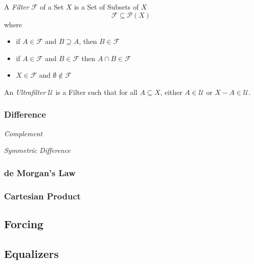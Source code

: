 \documentclass{article}
\begin{document}
A \emph{Filter} $\mathcal{F}$ of a Set $X$ is a Set of Subsets of $X$
\[
    \mathcal{F} \subseteq \mathcal{P}(X)
\]
where
\begin{itemize}
\item if $A \in \mathcal{F}$ and $B \supseteq A$, then $B \in
  \mathcal{F}$
\item if $A \in \mathcal{F}$ and $B \in \mathcal{F}$ then $A \cap B
  \in \mathcal{F}$
\item $X \in \mathcal{F}$ and $\emptyset \notin \mathcal{F}$
\end{itemize}
An \emph{Ultrafilter} $\mathcal{U}$ is a Filter such that for all $A
\subseteq X$, either $A \in \mathcal{U}$ or $X - A \in \mathcal{U}$.

\subsubsection{Difference}\label{subsec:set_difference}

\emph{Complement}

\emph{Symmetric Difference}

\subsubsection{de Morgan's Law}\label{subsec:de_morgan}

\subsubsection{Cartesian Product}\label{subsec:set_product}

\subsection{Forcing}\label{subsec:forcing}

\subsection{Equalizers}\label{subsec:set_equalizer}
\end{document}
